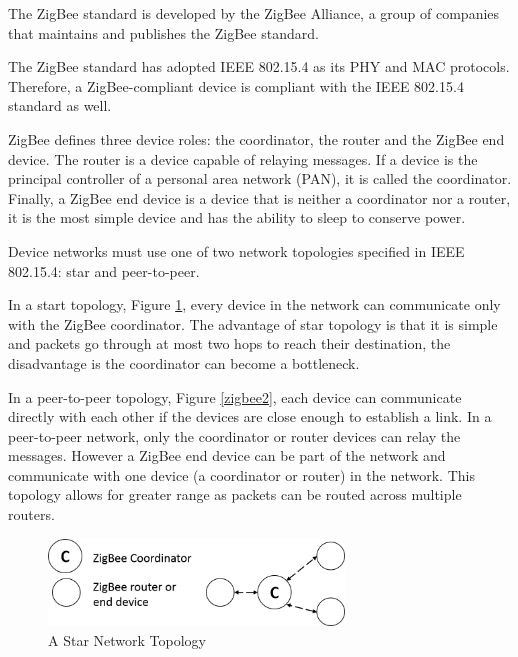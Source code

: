 The ZigBee standard is developed by the ZigBee Alliance, a group of companies that maintains and publishes the ZigBee standard. 

The ZigBee standard has adopted IEEE 802.15.4 as its \ac{PHY} and \ac{MAC} protocols. Therefore, a ZigBee-compliant device is compliant with the IEEE 802.15.4 standard as well. 

ZigBee defines three device roles: the coordinator, the router and the ZigBee end device. The router is a device capable of relaying messages. If a device is the principal controller of a personal area network (PAN), it is called the coordinator. Finally, a ZigBee end device is a device that is neither a coordinator nor a router, it is the most simple device and has the ability to sleep to conserve power.




Device networks must use one of two network topologies specified in IEEE 802.15.4: star and peer-to-peer. 

In a start topology, Figure \ref{zigbee1}, every device in the network can communicate only with the ZigBee coordinator. The advantage of star topology is that it is simple and packets go through at most two hops to reach their destination, the disadvantage is the coordinator can become a bottleneck.

In a peer-to-peer topology, Figure \ref{zigbee2}, each device can communicate directly with each other if the devices are close enough to establish a link. In a peer-to-peer network, only the coordinator or router devices can relay the messages. However a ZigBee end device can be part of the network and communicate with one device (a coordinator or router) in the network. This topology allows for greater range as packets can be routed across multiple routers.


\begin{figure}[h]
\centering
\includegraphics[width=0.7\textwidth]{Figures/zigbee1}
\caption{A Star Network Topology}
\label{zigbee1}
\end{figure}

